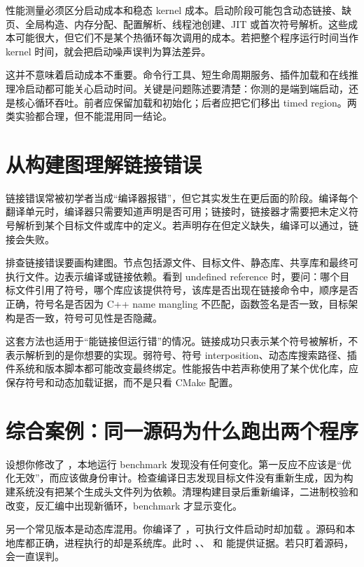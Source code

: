 性能测量必须区分启动成本和稳态 kernel 成本。启动阶段可能包含动态链接、缺页、全局构造、内存分配、配置解析、线程池创建、JIT 或首次符号解析。这些成本可能很大，但它们不是某个热循环每次调用的成本。若把整个程序运行时间当作 kernel 时间，就会把启动噪声误判为算法差异。

这并不意味着启动成本不重要。命令行工具、短生命周期服务、插件加载和在线推理冷启动都可能关心启动时间。关键是问题陈述要清楚：你测的是端到端启动，还是核心循环吞吐。前者应保留加载和初始化；后者应把它们移出 timed region。两类实验都合理，但不能混用同一结论。

\section{从构建图理解链接错误}

链接错误常被初学者当成“编译器报错”，但它其实发生在更后面的阶段。编译每个翻译单元时，编译器只需要知道声明是否可用；链接时，链接器才需要把未定义符号解析到某个目标文件或库中的定义。若声明存在但定义缺失，编译可以通过，链接会失败。

排查链接错误要画构建图。节点包括源文件、目标文件、静态库、共享库和最终可执行文件。边表示编译或链接依赖。看到 undefined reference 时，要问：哪个目标文件引用了符号，哪个库应该提供符号，该库是否出现在链接命令中，顺序是否正确，符号名是否因为 C++ name mangling 不匹配，函数签名是否一致，目标架构是否一致，符号可见性是否隐藏。

这套方法也适用于“能链接但运行错”的情况。链接成功只表示某个符号被解析，不表示解析到的是你想要的实现。弱符号、符号 interposition、动态库搜索路径、插件系统和版本脚本都可能改变最终绑定。性能报告中若声称使用了某个优化库，应保存符号和动态加载证据，而不是只看 CMake 配置。

\section{综合案例：同一源码为什么跑出两个程序}

设想你修改了 ，本地运行 benchmark 发现没有任何变化。第一反应不应该是“优化无效”，而应该做身份审计。检查编译日志发现目标文件没有重新生成，因为构建系统没有把某个生成头文件列为依赖。清理构建目录后重新编译，二进制校验和改变，反汇编中出现新循环，benchmark 才显示变化。

另一个常见版本是动态库混用。你编译了 ，可执行文件启动时却加载 。源码和本地库都正确，进程执行的却是系统库。此时 、、 和  能提供证据。若只盯着源码，会一直误判。

